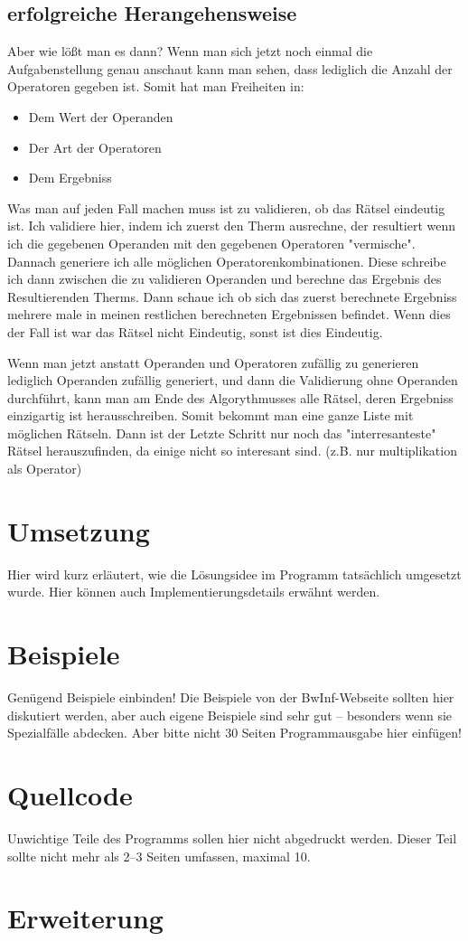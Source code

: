 \documentclass[a4paper,10pt,ngerman]{scrartcl}
\begin{document}
\subsection{erfolgreiche Herangehensweise}

Aber wie lößt man es dann?
\newline
Wenn man sich jetzt noch einmal die Aufgabenstellung genau anschaut kann man sehen, dass lediglich die Anzahl der Operatoren gegeben ist. Somit hat man Freiheiten in:
\begin{itemize}
\item Dem Wert der Operanden
\item Der Art der Operatoren
\item Dem Ergebniss
\end{itemize}
Was man auf jeden Fall machen muss ist zu validieren, ob das Rätsel eindeutig ist. Ich validiere hier, indem ich zuerst den Therm ausrechne, der resultiert wenn ich die gegebenen Operanden mit den gegebenen Operatoren "vermische". Dannach generiere ich alle möglichen Operatorenkombinationen. Diese schreibe ich dann zwischen die zu validieren Operanden und berechne das Ergebnis des Resultierenden Therms. Dann schaue ich ob sich das zuerst berechnete Ergebniss mehrere male in meinen restlichen berechneten Ergebnissen befindet. Wenn dies der Fall ist war das Rätsel nicht Eindeutig, sonst ist dies Eindeutig.

Wenn man jetzt anstatt Operanden und Operatoren zufällig zu generieren lediglich Operanden zufällig generiert, und dann die Validierung ohne Operanden durchführt, kann man am Ende des Algorythmusses alle Rätsel, deren Ergebniss einzigartig ist herausschreiben. Somit bekommt man eine ganze Liste mit möglichen Rätseln. Dann ist der Letzte Schritt nur noch das "interresanteste" Rätsel herauszufinden, da einige nicht so interesant sind. (z.B. nur multiplikation als Operator)

\section{Umsetzung}
Hier wird kurz erläutert, wie die Lösungsidee im Programm tatsächlich umgesetzt wurde. Hier können auch Implementierungsdetails erwähnt werden.

\section{Beispiele}
Genügend Beispiele einbinden! Die Beispiele von der BwInf-Webseite sollten hier diskutiert werden, aber auch eigene Beispiele sind sehr gut – besonders wenn sie Spezialfälle abdecken. Aber bitte nicht 30 Seiten Programmausgabe hier einfügen!

\section{Quellcode}
Unwichtige Teile des Programms sollen hier nicht abgedruckt werden. Dieser Teil sollte nicht mehr als 2–3 Seiten umfassen, maximal 10.

\section{Erweiterung}
\end{document}
